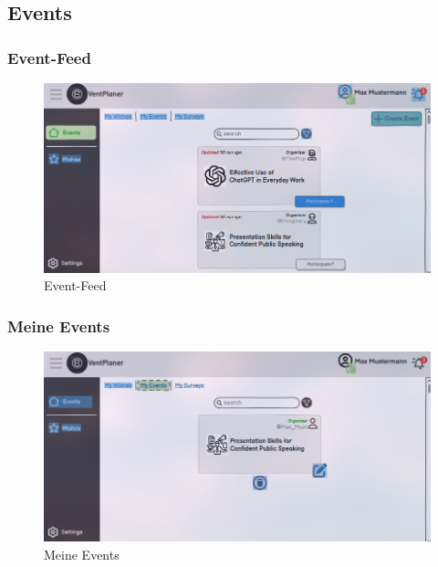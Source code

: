 \documentclass[a4paper,12pt]{article}
\begin{document}
\subsection{Events}
\subsubsection{Event-Feed}
\begin{figure}[H]
    \centering
    \includegraphics[width=1\textwidth]{Abbildungen/events/event_feed.png}
    \caption{Event-Feed}
    \label{fig:event_Feed}
\end{figure}

\subsubsection{Meine Events}
\begin{figure}[H]
    \centering
    \includegraphics[width=1\textwidth]{Abbildungen/events/my_events.png}
    \caption{Meine Events}
    \label{fig:my_events}
\end{figure}
\end{document}
